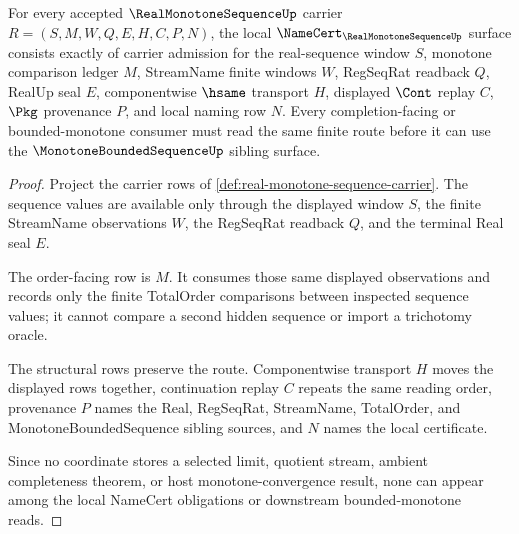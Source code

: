 \begin{theorem}
\label{thm:real-monotone-sequence-namecert-obligations}
For every accepted $\RealMonotoneSequenceUp$ carrier $R=(S,M,W,Q,E,H,C,P,N)$, the local $\NameCert_{\RealMonotoneSequenceUp}$ surface consists exactly of carrier admission for the real-sequence window $S$, monotone comparison ledger $M$, StreamName finite windows $W$, RegSeqRat readback $Q$, RealUp seal $E$, componentwise $\hsame$ transport $H$, displayed $\Cont$ replay $C$, $\Pkg$ provenance $P$, and local naming row $N$. Every completion-facing or bounded-monotone consumer must read the same finite route before it can use the $\MonotoneBoundedSequenceUp$ sibling surface.
\end{theorem}
\begin{proof}
Project the carrier rows of \autoref{def:real-monotone-sequence-carrier}. The sequence values are available only through the displayed window $S$, the finite StreamName observations $W$, the RegSeqRat readback $Q$, and the terminal Real seal $E$.

The order-facing row is $M$. It consumes those same displayed observations and records only the finite TotalOrder comparisons between inspected sequence values; it cannot compare a second hidden sequence or import a trichotomy oracle.

The structural rows preserve the route. Componentwise transport $H$ moves the displayed rows together, continuation replay $C$ repeats the same reading order, provenance $P$ names the Real, RegSeqRat, StreamName, TotalOrder, and MonotoneBoundedSequence sibling sources, and $N$ names the local certificate.

Since no coordinate stores a selected limit, quotient stream, ambient completeness theorem, or host monotone-convergence result, none can appear among the local NameCert obligations or downstream bounded-monotone reads.
\end{proof}




